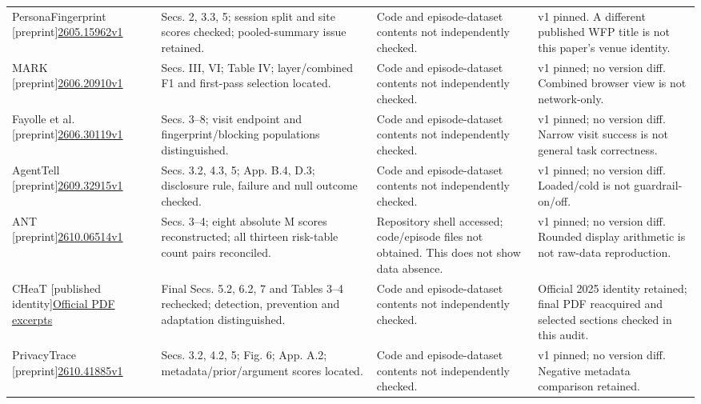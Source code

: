 \begin{table}[!tp]
\begin{tabularx}{\textwidth}{@{}P{.19\textwidth}P{.29\textwidth}P{.27\textwidth}Y@{}}
PersonaFingerprint [preprint]\newline\href{https://arxiv.org/abs/2605.15962v1}{2605.15962v1}
& Secs. 2, 3.3, 5; session split and site scores checked; pooled-summary issue retained.
& Code and episode-dataset contents not independently checked.
& v1 pinned. A different published WFP title is not this paper's venue identity. \\\addlinespace[4pt]
MARK [preprint]\newline\href{https://arxiv.org/abs/2606.20910v1}{2606.20910v1}
& Secs. III, VI; Table IV; layer/combined F1 and first-pass selection located.
& Code and episode-dataset contents not independently checked.
& v1 pinned; no version diff. Combined browser view is not network-only. \\\addlinespace[4pt]
Fayolle et al. [preprint]\newline\href{https://arxiv.org/abs/2606.30119v1}{2606.30119v1}
& Secs. 3--8; visit endpoint and fingerprint/blocking populations distinguished.
& Code and episode-dataset contents not independently checked.
& v1 pinned; no version diff. Narrow visit success is not general task correctness. \\\addlinespace[4pt]
AgentTell [preprint]\newline\href{https://arxiv.org/abs/2609.32915v1}{2609.32915v1}
& Secs. 3.2, 4.3, 5; App. B.4, D.3; disclosure rule, failure and null outcome checked.
& Code and episode-dataset contents not independently checked.
& v1 pinned; no version diff. Loaded/cold is not guardrail-on/off. \\\addlinespace[4pt]
ANT [preprint]\newline\href{https://arxiv.org/abs/2610.06514v1}{2610.06514v1}
& Secs. 3--4; eight absolute M scores reconstructed; all thirteen risk-table count pairs reconciled.
& Repository shell accessed; code/episode files not obtained. This does not show data absence.
& v1 pinned; no version diff. Rounded display arithmetic is not raw-data reproduction. \\\addlinespace[4pt]
CHeaT [published identity]\newline\href{https://www.usenix.org/system/files/usenixsecurity25-ayzenshteyn.pdf}{Official PDF excerpts}
& Final Secs. 5.2, 6.2, 7 and Tables 3--4 rechecked; detection, prevention and adaptation distinguished.
& Code and episode-dataset contents not independently checked.
& Official 2025 identity retained; final PDF reacquired and selected sections checked in this audit. \\\addlinespace[4pt]
PrivacyTrace [preprint]\newline\href{https://arxiv.org/abs/2610.41885v1}{2610.41885v1}
& Secs. 3.2, 4.2, 5; Fig. 6; App. A.2; metadata/prior/argument scores located.
& Code and episode-dataset contents not independently checked.
& v1 pinned; no version diff. Negative metadata comparison retained. \\\bottomrule
\end{tabularx}\end{table}
